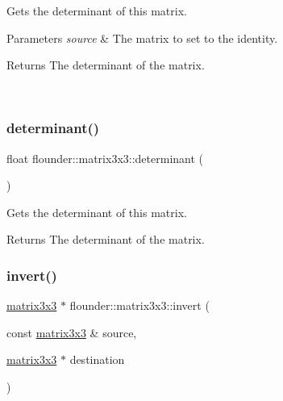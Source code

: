 Gets the determinant of this matrix. 


\begin{DoxyParams}{Parameters}
{\em source} & The matrix to set to the identity. \begin{DoxyReturn}{Returns}
The determinant of the matrix. 
\end{DoxyReturn}
\\
\hline
\end{DoxyParams}
\mbox{\label{classflounder_1_1matrix3x3_a6c25560ee28e4d9190fe33b4559dd4e1}} 
\subsubsection{\texorpdfstring{determinant()}{determinant()}\hspace{0.1cm}{\footnotesize\ttfamily [2/2]}}
{\footnotesize\ttfamily float flounder\+::matrix3x3\+::determinant (\begin{DoxyParamCaption}{ }\end{DoxyParamCaption})}



Gets the determinant of this matrix. 

\begin{DoxyReturn}{Returns}
The determinant of the matrix. 
\end{DoxyReturn}
\mbox{\label{classflounder_1_1matrix3x3_a894192d848137b9261503b6b9b203fd3}} 
\subsubsection{\texorpdfstring{invert()}{invert()}\hspace{0.1cm}{\footnotesize\ttfamily [1/2]}}
{\footnotesize\ttfamily \hyperlink{classflounder_1_1matrix3x3}{matrix3x3} $\ast$ flounder\+::matrix3x3\+::invert (\begin{DoxyParamCaption}\item[{const \hyperlink{classflounder_1_1matrix3x3}{matrix3x3} \&}]{source,  }\item[{\hyperlink{classflounder_1_1matrix3x3}{matrix3x3} $\ast$}]{destination }\end{DoxyParamCaption})\hspace{0.3cm}{\ttfamily [static]}}



